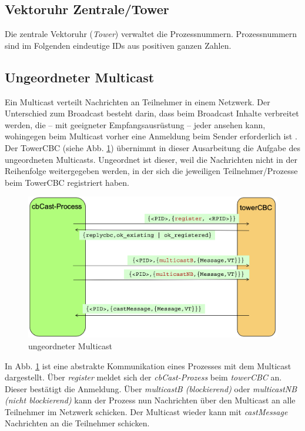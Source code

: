 \subsection{Vektoruhr Zentrale/Tower} \label{tower}

Die zentrale Vektoruhr (\textit{Tower}) verwaltet die Prozessnummern. Prozessnummern sind im Folgenden eindeutige IDs aus positiven ganzen Zahlen.

\subsection{Ungeordneter Multicast}

Ein Multicast verteilt Nachrichten an Teilnehmer in einem Netzwerk. Der Unterschied zum Broadcast besteht darin, dass beim Broadcast Inhalte verbreitet werden, die – mit geeigneter Empfangsausrüstung – jeder ansehen kann, wohingegen beim Multicast vorher eine Anmeldung beim Sender erforderlich ist \cite{wiki:Multicast}.\\
Der TowerCBC (siehe Abb. \ref{fig:towerCBC}) übernimmt in dieser Ausarbeitung die Aufgabe des ungeordneten Multicasts. Ungeordnet ist dieser, weil die Nachrichten nicht in der Reihenfolge weitergegeben werden, in der sich die jeweiligen Teilnehmer/Prozesse beim TowerCBC registriert haben.

\begin{figure}[htbp]
\begin{center}
\includegraphics[scale=0.4]{Latex/Bilder/towerCBC_1.png}
\caption{\label{fig:towerCBC} ungeordneter Multicast \cite{Aufgabenstellung}} 
\end{center}
\end{figure}

In Abb. \ref{fig:towerCBC} ist eine abstrakte Kommunikation eines Prozesses mit dem Multicast dargestellt. Über \textit{register} meldet sich der \textit{cbCast-Prozess} beim \textit{towerCBC} an. Dieser bestätigt die Anmeldung. Über \textit{multicastB (blockierend)} oder \textit{multicastNB (nicht blockierend)} kann der Prozess nun Nachrichten über den Multicast an alle Teilnehmer im Netzwerk schicken. Der Multicast wieder kann mit \textit{castMessage} Nachrichten an die Teilnehmer schicken.
